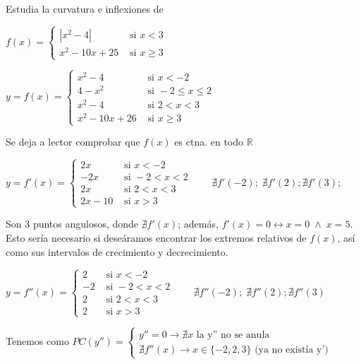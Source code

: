 	\begin{ejem} Estudia la curvatura e inflexiones de 
	
	$f(x)=\begin{cases}
		|x^2-4| & \mbox{ si } x<3 \\
		x^2-10x+25 & \mbox{ si } x\ge 3
		\end{cases}$
		
	$y=f(x)=\begin{cases}
	x^2-4 & \mbox{ si } x<-2 \\
	4-x^2 & \mbox{ si } -2\le x \le 2 \\
	x^2-4 & \mbox{ si } 2<x<3 \\
	x^2-10x+26 & \mbox{ si } x\ge 3
	\end{cases} $ 
	
	Se deja a lector comprobar que $f(x)$ es ctna. en todo $\mathbb R$	
	
	$y=f'(x)=\begin{cases}
	2x & \mbox{ si } x<-2 \\
	-2x & \mbox{ si } -2< x < 2 \\
	2x & \mbox{ si } 2<x<3 \\
	2x-10 & \mbox{ si } x> 3
	\end{cases} \qquad \nexists f'(-2); \; \nexists f'(2); \nexists f'(3);$  
	
	Son 3 puntos angulosos, donde $\nexists f'(x)$; además, $f'(x)=0 \leftrightarrow x=0 \; \wedge \; x=5$. Esto sería necesario si deseáramos encontrar los extremos relativos de $f(x)$, así como sus intervalos de crecimiento y decrecimiento.
	
	$y=f''(x)=\begin{cases}
	2 & \mbox{ si } x<-2 \\
	-2 & \mbox{ si } -2< x < 2 \\
	2 & \mbox{ si } 2<x<3 \\
	2 & \mbox{ si } x> 3
	\end{cases} \qquad \nexists f''(-2); \; \nexists f''(2); \nexists f''(3)$  
	
	Tenemos como $PC(y'')=\begin{cases}
	y''=0 \to \nexists x \mbox{ la y'' no se anula}  \\
	\nexists f''(x) \to x \in \{-2,2,3\} \mbox{ (ya no existía y') }
	\end{cases}
	$
		

\end{ejem}

